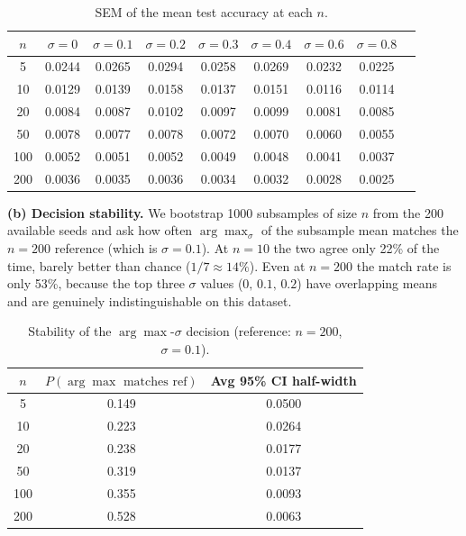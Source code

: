 \documentclass[11pt]{article}
\begin{document}
\begin{table}[h]
\centering
\small
\begin{tabular}{ccccccccc}
\toprule
$n$ & $\sigma{=}0$ & $\sigma{=}0.1$ & $\sigma{=}0.2$ & $\sigma{=}0.3$ & $\sigma{=}0.4$ & $\sigma{=}0.6$ & $\sigma{=}0.8$ \\
\midrule
5   & 0.0244 & 0.0265 & 0.0294 & 0.0258 & 0.0269 & 0.0232 & 0.0225 \\
10  & 0.0129 & 0.0139 & 0.0158 & 0.0137 & 0.0151 & 0.0116 & 0.0114 \\
20  & 0.0084 & 0.0087 & 0.0102 & 0.0097 & 0.0099 & 0.0081 & 0.0085 \\
50  & 0.0078 & 0.0077 & 0.0078 & 0.0072 & 0.0070 & 0.0060 & 0.0055 \\
100 & 0.0052 & 0.0051 & 0.0052 & 0.0049 & 0.0048 & 0.0041 & 0.0037 \\
200 & 0.0036 & 0.0035 & 0.0036 & 0.0034 & 0.0032 & 0.0028 & 0.0025 \\
\bottomrule
\end{tabular}
\caption{SEM of the mean test accuracy at each $n$.}
\end{table}

\textbf{(b) Decision stability.} We bootstrap 1000 subsamples of size $n$ from
the 200 available seeds and ask how often $\arg\max_\sigma$ of the subsample
mean matches the $n{=}200$ reference (which is $\sigma{=}0.1$). At $n{=}10$
the two agree only 22\% of the time, barely better than chance
($1/7 \approx 14\%$). Even at $n{=}200$ the match rate is only 53\%, because
the top three $\sigma$ values ($0,\,0.1,\,0.2$) have overlapping means and are
genuinely indistinguishable on this dataset.

\begin{table}[h]
\centering
\begin{tabular}{ccc}
\toprule
$n$ & $P(\arg\max \text{ matches ref})$ & Avg 95\% CI half-width \\
\midrule
5   & 0.149 & 0.0500 \\
10  & 0.223 & 0.0264 \\
20  & 0.238 & 0.0177 \\
50  & 0.319 & 0.0137 \\
100 & 0.355 & 0.0093 \\
200 & 0.528 & 0.0063 \\
\bottomrule
\end{tabular}
\caption{Stability of the $\arg\max$-$\sigma$ decision (reference: $n{=}200$, $\sigma{=}0.1$).}
\end{table}
\end{document}
